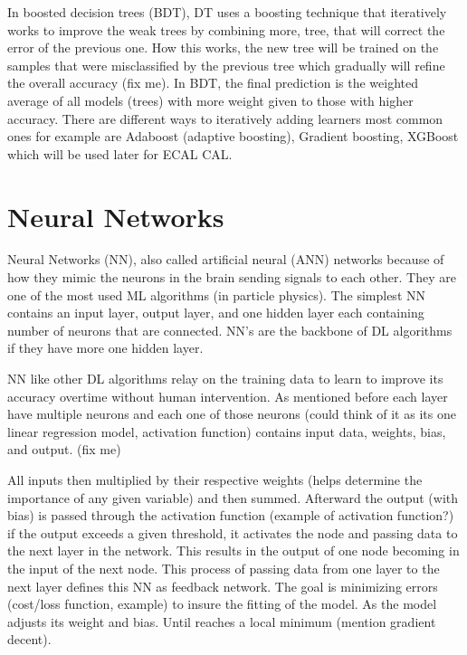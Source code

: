 In boosted decision trees (BDT), DT uses a boosting technique that iteratively works to improve the weak trees by combining more, tree, that will correct the error of the previous one. How this works, the new tree will be trained on the samples that were misclassified by the previous tree which gradually will refine the overall accuracy (fix me).  In BDT, the final prediction is the weighted average of all models (trees) with more weight given to those with higher accuracy.  There are different ways to iteratively adding learners %
most common ones for example are Adaboost (adaptive boosting), Gradient boosting, XGBoost which will be used later for ECAL CAL.

\section{Neural Networks}
Neural Networks (NN), also called artificial neural (ANN) networks because of how they mimic the neurons in the brain sending signals to each other. 
They are one of the most used ML algorithms (in particle physics). 
The simplest NN contains an input layer, output layer, and one hidden layer each containing number of neurons that are connected. NN’s are the backbone of DL algorithms if they have more one hidden layer. %

NN like other DL algorithms relay on the training data to learn to improve its accuracy overtime without human intervention. As mentioned before each layer have multiple neurons and each one of those neurons (could think of it as its one linear regression model, activation function) contains input data, weights, bias, and output. (fix me)

All inputs then multiplied by their respective weights (helps determine the importance of any given variable) and then summed. Afterward the output (with bias) is passed through the activation function (example of activation function?) if the output exceeds a given threshold, it activates the node and passing data to the next layer in the network. This results in the output of one node becoming in the input of the next node. This process of passing data from one layer to the next layer defines this NN as feedback network. The goal is minimizing errors (cost/loss function, example) to insure the fitting of the model. As the model adjusts its weight and bias. Until reaches a local minimum (mention gradient decent).










